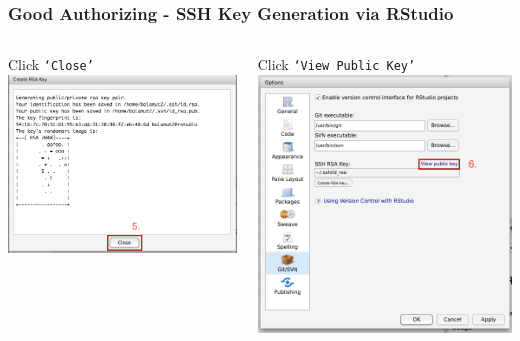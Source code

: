 \documentclass{beamer}\usepackage[]{graphicx}\usepackage[]{color}
\begin{document}
\begin{frame}[fragile]
\frametitle{Good Authorizing - SSH Key Generation via RStudio}

\begin{columns}[t]
\centering
\begin{block}{Click \texttt{`Close'}}
\centering
\includegraphics[scale=0.21]{img/ssh/rstudio_succesful_generation.png}
\end{block}
\centering
\begin{block}{Click \texttt{`View Public Key'}}
\centering
\includegraphics[scale=0.27]{img/ssh/rstudio_ssh_key.png}
\end{block}
\end{columns}

\end{frame}
\end{document}
